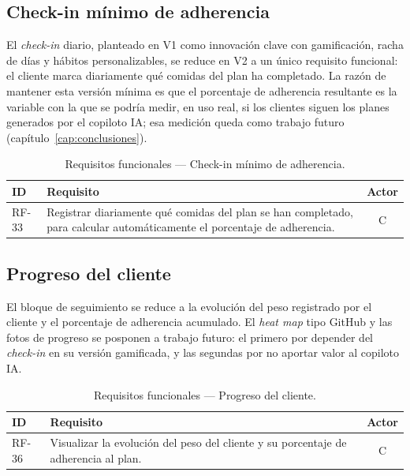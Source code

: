 \subsection{Check-in mínimo de adherencia}

El \textit{check-in} diario, planteado en V1 como innovación clave con gamificación, racha de días y hábitos personalizables, se reduce en V2 a un único requisito funcional: el cliente marca diariamente qué comidas del plan ha completado. La razón de mantener esta versión mínima es que el porcentaje de adherencia resultante es la variable con la que se podría medir, en uso real, si los clientes siguen los planes generados por el copiloto IA; esa medición queda como trabajo futuro (capítulo~\ref{cap:conclusiones}).

\begin{table}[htbp]
\centering
\small
\begin{tabular}{|l|p{10.5cm}|c|}
\hline
\textbf{ID} & \textbf{Requisito} & \textbf{Actor} \\
\hline
RF-33 & Registrar diariamente qué comidas del plan se han completado, para calcular automáticamente el porcentaje de adherencia. & C \\
\hline
\end{tabular}
\caption{Requisitos funcionales --- Check-in mínimo de adherencia.}
\label{tab:rf-checkin}
\end{table}

\subsection{Progreso del cliente}

El bloque de seguimiento se reduce a la evolución del peso registrado por el cliente y el porcentaje de adherencia acumulado. El \textit{heat map} tipo GitHub y las fotos de progreso se posponen a trabajo futuro: el primero por depender del \textit{check-in} en su versión gamificada, y las segundas por no aportar valor al copiloto IA.

\begin{table}[htbp]
\centering
\small
\begin{tabular}{|l|p{10.5cm}|c|}
\hline
\textbf{ID} & \textbf{Requisito} & \textbf{Actor} \\
\hline
RF-36 & Visualizar la evolución del peso del cliente y su porcentaje de adherencia al plan. & C \\
\hline
\end{tabular}
\caption{Requisitos funcionales --- Progreso del cliente.}
\label{tab:rf-progreso}
\end{table}

